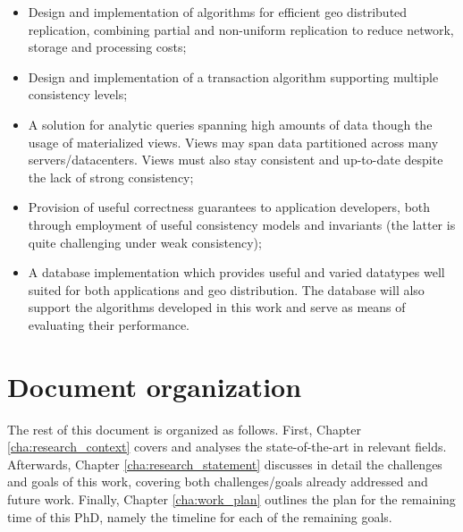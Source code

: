 \begin{itemize}
	\item Design and implementation of algorithms for efficient geo distributed replication, combining partial and non-uniform replication to reduce network, storage and processing costs;
	\item Design and implementation of a transaction algorithm supporting multiple consistency levels;
	\item A solution for analytic queries spanning high amounts of data though the usage of materialized views.
	Views may span data partitioned across many servers/datacenters.
	Views must also stay consistent and up-to-date despite the lack of strong consistency;
	\item Provision of useful correctness guarantees to application developers, both through employment of useful consistency models and invariants (the latter is quite challenging under weak consistency);
	\item A database implementation which provides useful and varied datatypes well suited for both applications and geo distribution.
	The database will also support the algorithms developed in this work and serve as means of evaluating their performance.
\end{itemize}

\section{Document organization}

The rest of this document is organized as follows.
First, Chapter \ref{cha:research_context} covers and analyses the state-of-the-art in relevant fields.
Afterwards, Chapter \ref{cha:research_statement} discusses in detail the challenges and goals of this work, covering both challenges/goals already addressed and future work.
Finally, Chapter \ref{cha:work_plan} outlines the plan for the remaining time of this PhD, namely the timeline for each of the remaining goals.





